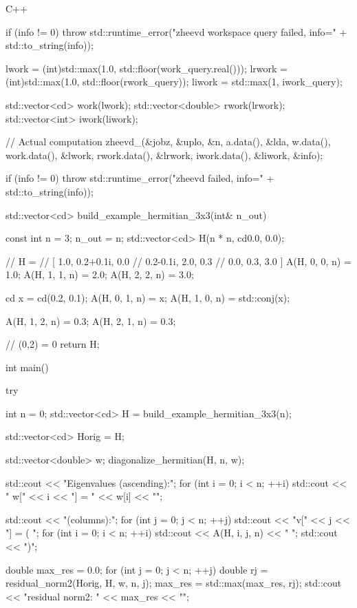 \documentclass[12pt]{jreport}
\begin{document}
\begin{codebox}{C++}
{    if (info != 0) {
        throw std::runtime_error("zheevd workspace query failed, info=" + std::to_string(info));
    }

    lwork  = (int)std::max(1.0, std::floor(work_query.real()));
    lrwork = (int)std::max(1.0, std::floor(rwork_query));
    liwork = std::max(1, iwork_query);

    std::vector<cd> work(lwork);
    std::vector<double> rwork(lrwork);
    std::vector<int> iwork(liwork);

    // Actual computation
    zheevd_(&jobz, &uplo, &n,
            a.data(), &lda,
            w.data(),
            work.data(), &lwork,
            rwork.data(), &lrwork,
            iwork.data(), &liwork,
            &info);

    if (info != 0) {
        throw std::runtime_error("zheevd failed, info=" + std::to_string(info));
    }
}

std::vector<cd> build_example_hermitian_3x3(int& n_out) {
    const int n = 3;
    n_out = n;
    std::vector<cd> H(n * n, cd{0.0, 0.0});

    // H =
    // [ 1.0, 0.2+0.1i, 0.0
    //   0.2-0.1i, 2.0, 0.3
    //   0.0, 0.3, 3.0 ]
    A(H, 0, 0, n) = 1.0;
    A(H, 1, 1, n) = 2.0;
    A(H, 2, 2, n) = 3.0;

    cd x = cd(0.2, 0.1);
    A(H, 0, 1, n) = x;
    A(H, 1, 0, n) = std::conj(x);

    A(H, 1, 2, n) = 0.3;
    A(H, 2, 1, n) = 0.3;

    // (0,2) = 0
    return H;
}

int main() {
    try {
        int n = 0;
        std::vector<cd> H = build_example_hermitian_3x3(n);

        std::vector<cd> Horig = H;

        std::vector<double> w;
        diagonalize_hermitian(H, n, w);

        std::cout << "Eigenvalues (ascending):\n";
        for (int i = 0; i < n; ++i) {
            std::cout << "  w[" << i << "] = " << w[i] << "\n";
        }

        std::cout << "\nEigenvectors (columns):\n";
        for (int j = 0; j < n; ++j) {
            std::cout << "v[" << j << "] = ( ";
            for (int i = 0; i < n; ++i) {
                std::cout << A(H, i, j, n) << " ";
            }
            std::cout << ")\n";
        }

        double max_res = 0.0;
        for (int j = 0; j < n; ++j) {
            double rj = residual_norm2(Horig, H, w, n, j);
            max_res = std::max(max_res, rj);
        }
        std::cout << "\nMax residual norm2: " << max_res << "\n";

}}
\end{codebox}
\end{document}
